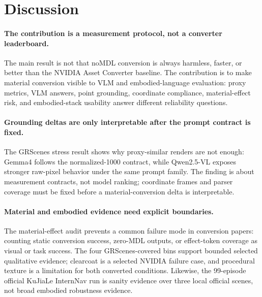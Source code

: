 \section{Discussion}
\label{sec:discussion}

\paragraph{The contribution is a measurement protocol, not a converter leaderboard.}
The main result is not that noMDL conversion is always harmless, faster, or
better than the NVIDIA Asset Converter baseline. The contribution is to make
material conversion visible to VLM and embodied-language evaluation: proxy
metrics, VLM answers, point grounding, coordinate compliance, material-effect
risk, and embodied-stack usability answer different reliability questions.

\paragraph{Grounding deltas are only interpretable after the prompt contract is fixed.}
The GRScenes stress result shows why proxy-similar renders are not enough:
Gemma4 follows the normalized-1000 contract, while Qwen2.5-VL exposes stronger
raw-pixel behavior under the same prompt family. The finding is about
measurement contracts, not model ranking; coordinate frames and parser coverage
must be fixed before a material-conversion delta is interpretable.

\paragraph{Material and embodied evidence need explicit boundaries.}
The material-effect audit prevents a common failure mode in conversion papers:
counting static conversion success, zero-MDL outputs, or effect-token coverage
as visual or task success. The four GRScenes-covered bins support bounded
selected qualitative evidence; clearcoat is a selected NVIDIA failure case, and
procedural texture is a limitation for both converted conditions. Likewise, the
99-episode official KuJiaLe InternNav run is sanity evidence over three local
official scenes, not broad embodied robustness evidence.
